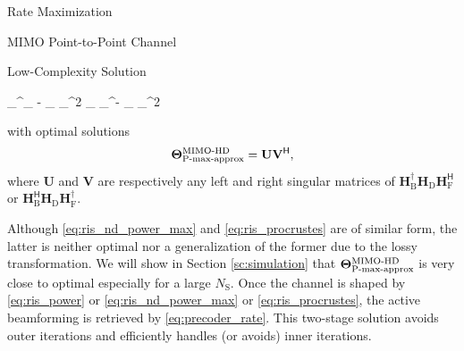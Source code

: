 \documentclass[journal]{IEEEtran}
\begin{document}
\begin{section}{Rate Maximization}
\begin{subsection}{MIMO Point-to-Point Channel}
\begin{subsubsection}{Low-Complexity Solution}
\begin{itemize}
					\begin{mini!}
						{\scriptstyle{\mathbf{\Theta}}}{\lVert \mathbf{H}_^\dagger {}_ - \mathbf{\Theta} _\mathrm{F} \rVert _^2  \lVert \mathbf{H}_ _^\dagger - _ \mathbf{\Theta} \rVert _^2}{\label{op:procrustes}}{}
					\end{mini!}
					with optimal solutions \cite[(6.4.1)]{Golub2013}
					\begin{equation}
						\label{eq:ris_procrustes}
						\mathbf{\Theta}_\textnormal{P-max-approx}^\textnormal{MIMO-HD} = \mathbf{U} \mathbf{V}^\mathsf{H},
					\end{equation}
					where $\mathbf{U}$ and $\mathbf{V}$ are respectively any left and right singular matrices of $\mathbf{H}_\mathrm{B}^\dagger \mathbf{H}_\mathrm{D} \mathbf{H}_\mathrm{F}^\mathsf{H}$ or $\mathbf{H}_\mathrm{B}^\mathsf{H} \mathbf{H}_\mathrm{D} \mathbf{H}_\mathrm{F}^\dagger$.
				\end{itemize}

				Although \eqref{eq:ris_nd_power_max} and \eqref{eq:ris_procrustes} are of similar form, the latter is neither optimal nor a generalization of the former due to the lossy transformation.
				We will show in Section \ref{sc:simulation} that $\mathbf{\Theta}_\textnormal{P-max-approx}^\textnormal{MIMO-HD}$ is very close to optimal especially for a large $N_\mathrm{S}$.
				Once the channel is shaped by \eqref{eq:ris_power} or \eqref{eq:ris_nd_power_max} or \eqref{eq:ris_procrustes}, the active beamforming is retrieved by \eqref{eq:precoder_rate}.
				This two-stage solution avoids outer iterations and efficiently handles (or avoids) inner iterations.
			\end{subsubsection}
		\end{subsection}


\end{section}
\end{document}
